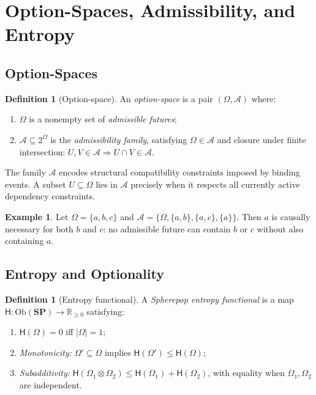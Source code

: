 \documentclass[12pt,a4paper]{article}
\theoremstyle{definition}
\newtheorem{definition}[theorem]{Definition}
\newtheorem{example}[theorem]{Example}
\theoremstyle{remark}
\newcommand{\Rnn}{\mathbb{R}_{\ge 0}}
\newcommand{\Ent}{\ensuremath{\mathsf{H}}}
\newcommand{\SP}{\mathbf{SP}}
\newcommand{\Ob}{\mathrm{Ob}}
\newcommand{\tensor}{\otimes}
\begin{document}
\section{Option-Spaces, Admissibility, and Entropy}
\label{sec:ontology}

\subsection{Option-Spaces}

\begin{definition}[Option-space]
\label{def:optspace}
An \emph{option-space} is a pair $(\Omega,\mathcal{A})$ where:
\begin{enumerate}[label=(\roman*)]
\item $\Omega$ is a nonempty set of \emph{admissible futures};
\item $\mathcal{A}\subseteq 2^\Omega$ is the \emph{admissibility family}, satisfying
  $\Omega\in\mathcal{A}$ and closure under finite intersection:
  $U,V\in\mathcal{A}\Rightarrow U\cap V\in\mathcal{A}$.
\end{enumerate}
\end{definition}

The family $\mathcal{A}$ encodes structural compatibility constraints imposed by
binding events. A subset $U\subseteq\Omega$ lies in $\mathcal{A}$ precisely when it
respects all currently active dependency constraints.

\begin{example}
Let $\Omega=\{a,b,c\}$ and $\mathcal{A}=\{\Omega,\{a,b\},\{a,c\},\{a\}\}$. Then
$a$ is causally necessary for both $b$ and $c$: no admissible future can contain $b$
or $c$ without also containing $a$.
\end{example}

\subsection{Entropy and Optionality}

\begin{definition}[Entropy functional]
\label{def:entropy}
A \emph{Spherepop entropy functional} is a map $\Ent:\Ob(\SP)\to\Rnn$ satisfying:
\begin{enumerate}[label=(\roman*)]
\item $\Ent(\Omega)=0$ iff $|\Omega|=1$;
\item \emph{Monotonicity:} $\Omega'\subseteq\Omega$ implies $\Ent(\Omega')\le\Ent(\Omega)$;
\item \emph{Subadditivity:} $\Ent(\Omega_1\tensor\Omega_2)\le\Ent(\Omega_1)+\Ent(\Omega_2)$,
  with equality when $\Omega_1,\Omega_2$ are independent.
\end{enumerate}
\end{definition}
\end{document}
